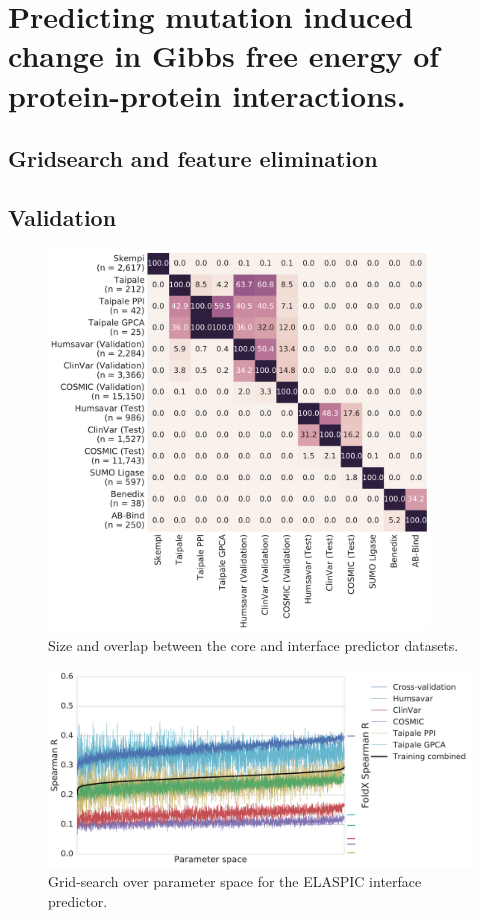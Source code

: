 \clearpage

\section{Predicting mutation induced change in Gibbs free energy of protein-protein interactions.}

\subsection{Gridsearch and feature elimination}

\subsection{Validation}


\begin{figure}[!htb]
	\centering
	\includegraphics[width=0.9\textwidth]{static/elaspic_training_set/data_statistics/training_set_overlap_data_df_tt_interface.pdf}
	\caption[Interface predictor datasets.]{Size and overlap between the core and interface predictor datasets.}
\end{figure}


\begin{figure}[!htb]
	\includegraphics[width=0.9\linewidth]{static/elaspic_training_set/machine_learning/gridsearch_interface.pdf}
	\caption{Grid-search over parameter space for the ELASPIC interface predictor.}
	\label{fig:gridsearch_interface}
\end{figure}


